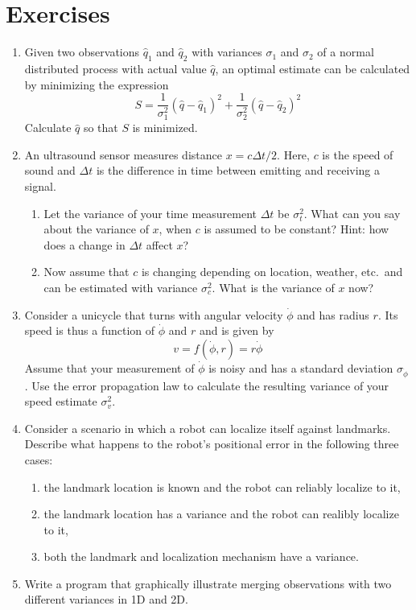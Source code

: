\section*{Exercises}\small
\begin{enumerate}
\item Given two observations $\hat{q}_1$ and $\hat{q}_2$ with variances $\sigma_1$ and $\sigma_2$ of a normal distributed process with actual value $\hat{q}$, an optimal estimate can be calculated by minimizing the expression
\begin{equation}
\nonumber
S=\frac{1}{\sigma_1^2}(\hat{q}-\hat{q}_1)^2+\frac{1}{\sigma_2^2}(\hat{q}-\hat{q}_2)^2
\end{equation}
Calculate $\hat{q}$ so that $S$ is minimized.
\item An ultrasound sensor measures distance $x=c\Delta t/2$. Here, $c$ is the speed of sound and $\Delta t$ is the difference in time between emitting and receiving a signal.
\begin{enumerate}
\item Let the variance of your time measurement $\Delta t$ be $\sigma_t^2$. What can you say about the variance of $x$, when $c$ is assumed to be constant? Hint: how does a change in $\Delta t$ affect $x$?
\item Now assume that $c$ is changing depending on location, weather, etc.\ and can be estimated with variance $\sigma_c^2$. What is the variance of $x$ now?
\end{enumerate}
\item Consider a unicycle that turns with angular velocity $\dot{\phi}$ and has radius $r$. Its speed is thus a function of $\dot{\phi}$ and $r$ and is given by
\begin{equation}
\nonumber
v=f(\dot{\phi},r)=r\dot{\phi}
\end{equation}
Assume that your measurement of $\dot{\phi}$ is noisy and has a standard deviation $\sigma_{\dot{\phi}}$.  Use the error propagation law to calculate the resulting variance of your speed estimate $\sigma_v^2$.
\item Consider a scenario in which a robot can localize itself against landmarks. Describe what happens to the robot's positional error in the following three cases:
\begin{enumerate}
\item the landmark location is known and the robot can reliably localize to it, 
\item the landmark location has a variance and the robot can realibly localize to it,
\item both the landmark and localization mechanism have a variance. 
\end{enumerate}
\item Write a program that graphically illustrate merging observations with two different variances in 1D and 2D. 
\end{enumerate}
\normalsize
